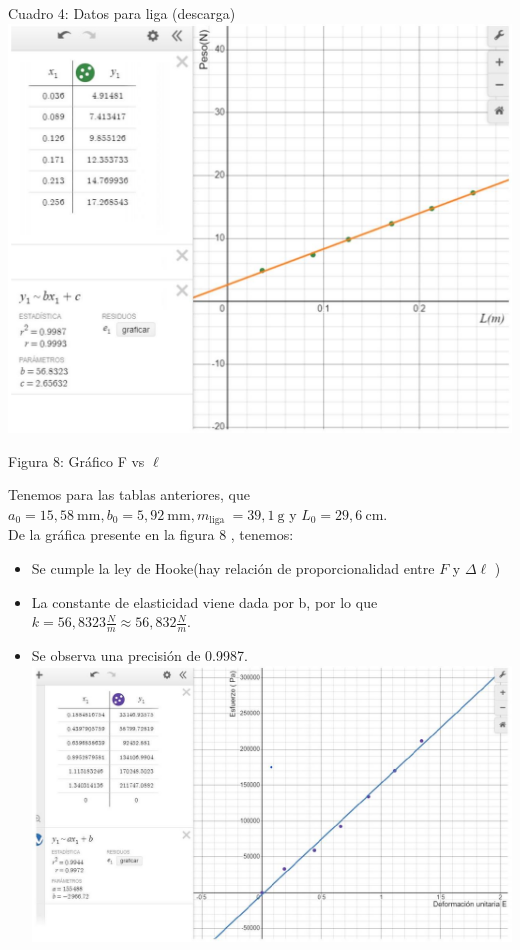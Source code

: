\documentclass[10pt]{article}
\begin{document}
Cuadro 4: Datos para liga (descarga)\\
\includegraphics[max width=\textwidth, center]{2025_04_28_5f0b00b867417d4cd835g-3}

Figura 8: Gráfico F vs $\ell$

Tenemos para las tablas anteriores, que $a_{0}=15,58 \mathrm{~mm}, b_{0}=5,92 \mathrm{~mm}, m_{\text {liga }}=39,1 \mathrm{~g}$ y $L_{0}=29,6 \mathrm{~cm}$.\\
De la gráfica presente en la figura 8 , tenemos:

\begin{itemize}
  \item Se cumple la ley de Hooke(hay relación de proporcionalidad entre $F$ y $\Delta \ell$ )
  \item La constante de elasticidad viene dada por b, por lo que $k=56,8323 \frac{N}{m} \approx 56,832 \frac{N}{m}$.
  \item Se observa una precisión de 0.9987.\\
\includegraphics[max width=\textwidth, center]{2025_04_28_5f0b00b867417d4cd835g-4}
\end{itemize}
\end{document}

